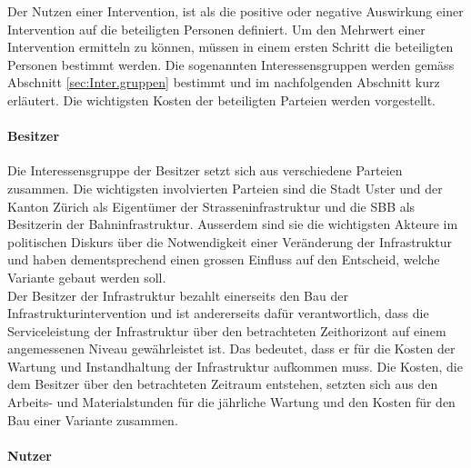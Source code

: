 %
%
%
%

\label{subsec:Gruppen}

Der Nutzen einer Intervention, ist als die positive oder negative Auswirkung einer Intervention auf die beteiligten Personen definiert. Um den Mehrwert einer Intervention ermitteln zu können, müssen in einem ersten Schritt die beteiligten Personen bestimmt werden. Die sogenannten Interessensgruppen werden gemäss Abschnitt \ref{sec:Inter.gruppen} bestimmt und im nachfolgenden Abschnitt kurz erläutert. Die wichtigsten Kosten der beteiligten Parteien werden vorgestellt.

\paragraph{Besitzer}

Die Interessensgruppe der Besitzer setzt sich aus verschiedene Parteien zusammen. Die wichtigsten involvierten Parteien sind die Stadt Uster und der Kanton Zürich als Eigentümer der Strasseninfrastruktur und die SBB als Besitzerin der Bahninfrastruktur. 
Ausserdem sind sie die wichtigsten Akteure im politischen Diskurs über die Notwendigkeit einer Veränderung der Infrastruktur und haben dementsprechend einen grossen Einfluss auf den Entscheid, welche Variante gebaut werden soll. \\ 
Der Besitzer der Infrastruktur bezahlt einerseits den Bau der Infrastrukturintervention und ist andererseits dafür verantwortlich, dass die Serviceleistung der Infrastruktur über den betrachteten Zeithorizont auf einem angemessenen Niveau gewährleistet ist. Das bedeutet, dass er für die Kosten der Wartung und Instandhaltung der Infrastruktur aufkommen muss. Die Kosten, die dem Besitzer über den betrachteten Zeitraum entstehen, setzten sich aus den Arbeits- und Materialstunden für die jährliche Wartung und den Kosten für den Bau einer Variante zusammen. 


\paragraph{Nutzer}

